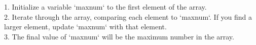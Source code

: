 \documentclass[preview]{standalone}
\begin{document}
1. Initialize a variable `maxnum` to the first element of the array.\\2. Iterate through the array, comparing each element to `maxnum`. If you find a larger element, update `maxnum` with that element.\\3. The final value of `maxnum` will be the maximum number in the array.\\
\end{document}
